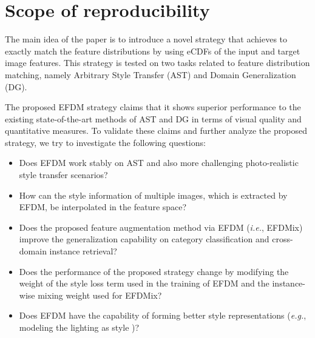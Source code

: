 \section{Scope of reproducibility}
\label{sec:claims}

The main idea of the paper is to introduce a novel strategy that achieves to exactly match the feature distributions by using eCDFs of the input and target image features. This strategy is tested on two tasks related to feature distribution matching, namely Arbitrary Style Transfer (AST) and Domain Generalization (DG). 

The proposed EFDM strategy claims that it shows superior performance to the existing state-of-the-art methods of AST and DG in terms of visual quality and quantitative measures. To validate these claims and further analyze the proposed strategy, we try to investigate the following questions:

\begin{itemize}
    \item Does EFDM work stably on AST and also more challenging photo-realistic style transfer scenarios?
    \item How can the style information of multiple images, which is extracted by EFDM, be interpolated in the feature space?
    \item Does the proposed feature augmentation method via EFDM (\textit{i.e.}, EFDMix) improve the generalization capability on category classification and cross-domain instance retrieval?
    \item Does the performance of the proposed strategy change by modifying the weight of the style loss term used in the training of EFDM and the instance-wise mixing weight used for EFDMix?
    \item Does EFDM have the capability of forming better style representations (\textit{e.g.}, modeling the lighting as style \cite{kinli2023modeling})?
\end{itemize}


